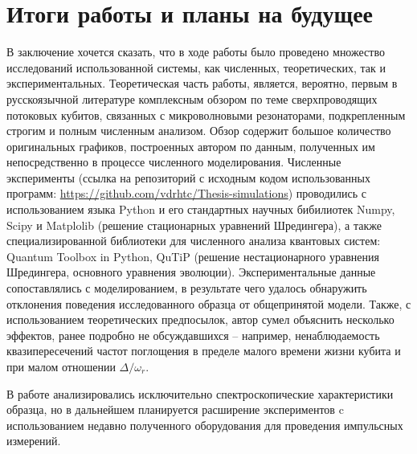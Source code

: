 \documentclass[12pt, twoside]{report}
\numberwithin{equation}{section}
\numberwithin{figure}{section}
\begin{document}
\section{Итоги работы и планы на будущее}

\hypersetup{hidelinks=false, colorlinks=true}

В заключение хочется сказать, что в ходе работы было проведено множество исследований использованной системы, как численных, теоретических, так и экспериментальных. Теоретическая часть работы, является, вероятно, первым в русскоязычной литературе комплексным обзором по теме сверхпроводящих потоковых кубитов, связанных с микроволновыми резонаторами, подкрепленным строгим и полным численным анализом. Обзор содержит большое количество оригинальных графиков, построенных автором по данным, полученных им непосредственно в процессе численного моделирования. Численные эксперименты (ссылка на репозиторий с исходным кодом использованных программ: \href{https://github.com/vdrhtc/Thesis-simulations}{https://github.com/vdrhtc/Thesis-simulations}) проводились с использованием языка Python и его стандартных научных бибилиотек Numpy, Scipy и Matplolib (решение стационарных уравнений Шредингера), а также специализированной библиотеки для численного анализа квантовых систем: Quantum Toolbox in Python, QuTiP\cite{Johansson2013} (решение нестационарного уравнения Шредингера, основного уравнения эволюции). Экспериментальные данные сопоставлялись с моделированием, в результате чего удалось обнаружить отклонения поведения исследованного образца от общепринятой модели. Также, с использованием теоретических предпосылок, автор сумел объяснить несколько эффектов, ранее подробно не обсуждавшихся -- например, ненаблюдаемость квазипересечений частот поглощения в пределе малого времени жизни кубита и при малом отношении $\Delta/\omega_r$.

В работе анализировались исключительно спектроскопические характеристики образца, но в дальнейшем планируется расширение экспериментов c использованием недавно полученного оборудования для проведения импульсных измерений.
\end{document}
